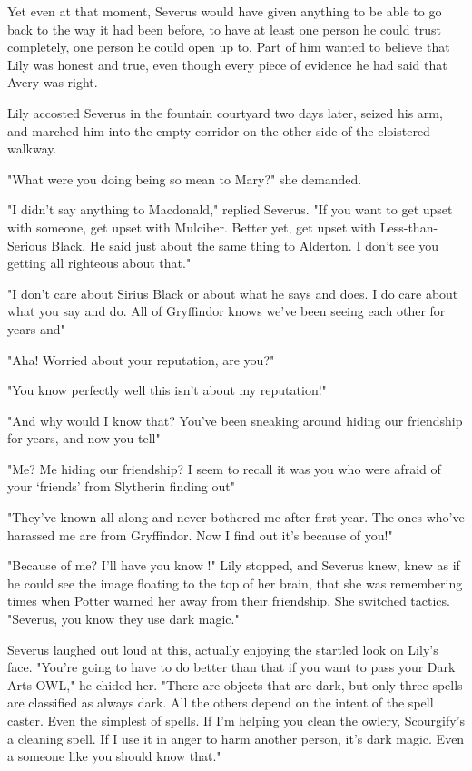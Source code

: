 Yet even at that moment, Severus would have given anything to be able to go back to the way it had been before, to have at least one person he could trust completely, one person he could open up to. Part of him wanted to believe that Lily was honest and true, even though every piece of evidence he had said that Avery was right.

Lily accosted Severus in the fountain courtyard two days later, seized his arm, and marched him into the empty corridor on the other side of the cloistered walkway.

"What were you doing being so mean to Mary?" she demanded.

"I didn't say anything to Macdonald," replied Severus. "If you want to get upset with someone, get upset with Mulciber. Better yet, get upset with Less-than-Serious Black. He said just about the same thing to Alderton. I don't see you getting all righteous about that."

"I don't care about Sirius Black or about what he says and does. I do care about what you say and do. All of Gryffindor knows we've been seeing each other for years and{\el}"

"Aha! Worried about your reputation, are you?"

"You know perfectly well this isn't about my reputation!"

"And why would I know that? You've been sneaking around hiding our friendship for years, and now you tell{\el}"

"Me? Me hiding our friendship? I seem to recall it was you who were afraid of your `friends' from Slytherin finding out{\el}"

"They've known all along and never bothered me after first year. The ones who've harassed me are from Gryffindor. Now I find out it's because of you!"

"Because of me? I'll have you know{\el} !" Lily stopped, and Severus knew, knew as if he could see the image floating to the top of her brain, that she was remembering times when Potter warned her away from their friendship. She switched tactics. "Severus, you know they use dark magic."

Severus laughed out loud at this, actually enjoying the startled look on Lily's face. "You're going to have to do better than that if you want to pass your Dark Arts OWL," he chided her. "There are objects that are dark, but only three spells are classified as always dark. All the others depend on the intent of the spell caster. Even the simplest of spells. If I'm helping you clean the owlery, Scourgify's a cleaning spell. If I use it in anger to harm another person, it's dark magic. Even a{\el} someone like you should know that."

